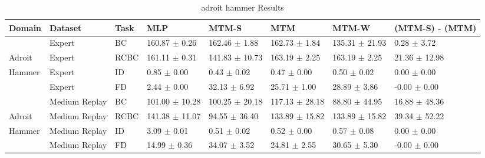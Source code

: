 \begin{table*}
  \small
  \caption{adroit hammer Results}
  \label{tab:adroit_hammer}
  \centering
  \begin{tabular}{l l l l l l l l}
    \toprule
Domain &       Dataset & Task &                MLP &              MTM-S &                MTM &              MTM-W &                                  (MTM-S) - (MTM) \\
    \midrule
       &        Expert &   BC &  160.87 $\pm$ 0.26 &  162.46 $\pm$ 1.88 &  162.73 $\pm$ 1.84 & 135.31 $\pm$ 21.93 & \textcolor[rgb]{0.00,0.50,0.00}{0.28 $\pm$ 3.72} \\
Adroit &        Expert & RCBC &  161.11 $\pm$ 0.31 & 141.83 $\pm$ 10.73 &  163.19 $\pm$ 2.25 &  163.19 $\pm$ 2.25 &  \textcolor[rgb]{0.0,1.0,0.0}{21.36 $\pm$ 12.98} \\
Hammer &        Expert &   ID &    0.85 $\pm$ 0.00 &    0.43 $\pm$ 0.02 &    0.47 $\pm$ 0.00 &    0.50 $\pm$ 0.02 & \textcolor[rgb]{0.00,0.00,0.00}{0.00 $\pm$ 0.00} \\
       &        Expert &   FD &    2.44 $\pm$ 0.00 &   32.13 $\pm$ 6.92 &   25.71 $\pm$ 1.00 &   28.89 $\pm$ 3.86 &                                 -0.00 $\pm$ 0.00 \\
    \midrule
       & Medium Replay &   BC & 101.00 $\pm$ 10.28 & 100.25 $\pm$ 20.18 & 117.13 $\pm$ 28.18 &  88.80 $\pm$ 44.95 &  \textcolor[rgb]{0.0,1.0,0.0}{16.88 $\pm$ 48.36} \\
Adroit & Medium Replay & RCBC & 141.38 $\pm$ 11.07 &  94.55 $\pm$ 36.40 & 133.89 $\pm$ 15.82 & 133.89 $\pm$ 15.82 &  \textcolor[rgb]{0.0,1.0,0.0}{39.34 $\pm$ 52.22} \\
Hammer & Medium Replay &   ID &    3.09 $\pm$ 0.01 &    0.51 $\pm$ 0.02 &    0.52 $\pm$ 0.00 &    0.57 $\pm$ 0.08 & \textcolor[rgb]{0.00,0.00,0.00}{0.00 $\pm$ 0.00} \\
       & Medium Replay &   FD &   14.99 $\pm$ 0.36 &   34.07 $\pm$ 3.52 &   24.81 $\pm$ 2.55 &   30.65 $\pm$ 5.30 &                                 -0.00 $\pm$ 0.00 \\
    \midrule
    \bottomrule
  \end{tabular}
\end{table*}
